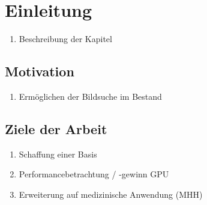 \chapter{Einleitung}

\begin{enumerate}
	\item Beschreibung der Kapitel
\end{enumerate}

\section{Motivation}

\begin{enumerate}
	\item Ermöglichen der  Bildsuche im Bestand
\end{enumerate}

\section{Ziele der Arbeit}

\begin{enumerate}
	\item Schaffung einer Basis
	\item Performancebetrachtung / -gewinn GPU
	\item Erweiterung auf medizinische Anwendung (MHH)
\end{enumerate}